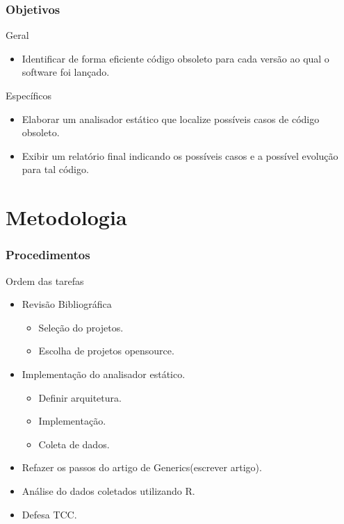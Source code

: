\documentclass[]{beamer}
\begin{document}
	
	\begin{frame}[fragile]\frametitle{Objetivos}
		\begin{block}{Geral}
			\begin{itemize}
				\item Identificar de forma eficiente código obsoleto para cada versão ao qual o software foi lançado.
			\end{itemize}
		\end{block}
			
			\begin{block}{Específicos}
				\begin{itemize}
					\item Elaborar um analisador estático que localize possíveis casos de código obsoleto.
					\item Exibir um relatório final indicando os possíveis casos e a possível evolução para tal código.
				\end{itemize}
			\end{block}
	\end{frame}
	
	\section{Metodologia}
	\begin{frame}[label=metodologia, fragile]
		\frametitle{Procedimentos}
		\begin{block}{Ordem das tarefas}
			\begin{itemize}
				\item Revisão Bibliográfica
					\begin{itemize}
						\item Seleção do projetos.
						\item Escolha de projetos opensource.
					\end{itemize}
				\item Implementação do analisador estático.
					\begin{itemize}
						\item Definir arquitetura.
						\item Implementação.
						\item Coleta de dados.
					\end{itemize}
				\item Refazer os passos do artigo de Generics(escrever artigo).
				\item Análise do dados coletados utilizando R.
				\item Defesa TCC.
			\end{itemize}
		\end{block}
	\end{frame}
	
\end{document}
